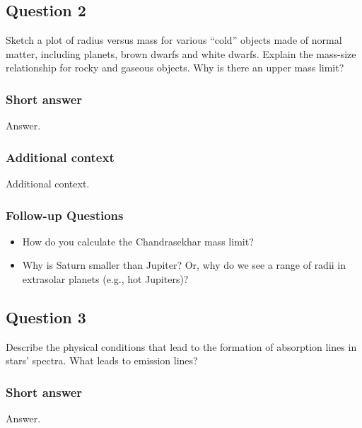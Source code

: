 \documentclass[a4paper,10pt]{article}
\begin{document}
\newpage
\subsection{Question 2}

Sketch a plot of radius versus mass for various ``cold'' objects made of normal matter, including planets, brown dwarfs and white dwarfs. Explain the mass-size relationship for rocky and
gaseous objects. Why is there an upper mass limit?

\subsubsection{Short answer}

Answer.

\subsubsection{Additional context}

Additional context.

\subsubsection{Follow-up Questions}

\begin{itemize}
    \item How do you calculate the Chandrasekhar mass limit?
    \item Why is Saturn smaller than Jupiter? Or, why do we see a range of radii in extrasolar planets (e.g., hot Jupiters)?
\end{itemize}


\newpage
\subsection{Question 3}

Describe the physical conditions that lead to the formation of absorption lines in stars' spectra. What leads to emission lines?

\subsubsection{Short answer}

Answer.
\end{document}
